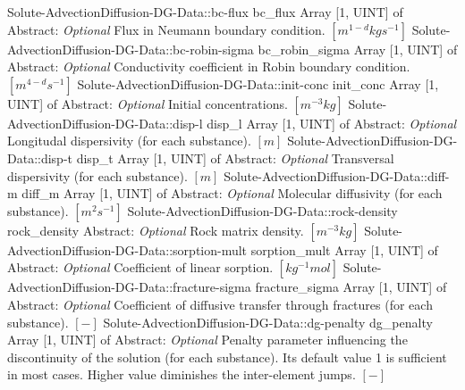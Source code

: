 \begin{RecordType}
		\RecKey
			{Solute-AdvectionDiffusion-DG-Data::bc-flux}
			{bc{\_}flux}
			{{Array [1, UINT] of }{Abstract}{: }}
			{ \it{Optional} }
			{{{Flux in Neumann boundary condition. }{$[m^{1-d}kgs^{-1}]$}}}
		\RecKey
			{Solute-AdvectionDiffusion-DG-Data::bc-robin-sigma}
			{bc{\_}robin{\_}sigma}
			{{Array [1, UINT] of }{Abstract}{: }}
			{ \it{Optional} }
			{{{Conductivity coefficient in Robin boundary condition. }{$[m^{4-d}s^{-1}]$}}}
		\RecKey
			{Solute-AdvectionDiffusion-DG-Data::init-conc}
			{init{\_}conc}
			{{Array [1, UINT] of }{Abstract}{: }}
			{ \it{Optional} }
			{{{Initial concentrations. }{$[m^{-3}kg]$}}}
		\RecKey
			{Solute-AdvectionDiffusion-DG-Data::disp-l}
			{disp{\_}l}
			{{Array [1, UINT] of }{Abstract}{: }}
			{ \it{Optional} }
			{{{Longitudal dispersivity (for each substance). }{$[m]$}}}
		\RecKey
			{Solute-AdvectionDiffusion-DG-Data::disp-t}
			{disp{\_}t}
			{{Array [1, UINT] of }{Abstract}{: }}
			{ \it{Optional} }
			{{{Transversal dispersivity (for each substance). }{$[m]$}}}
		\RecKey
			{Solute-AdvectionDiffusion-DG-Data::diff-m}
			{diff{\_}m}
			{{Array [1, UINT] of }{Abstract}{: }}
			{ \it{Optional} }
			{{{Molecular diffusivity (for each substance). }{$[m^{2}s^{-1}]$}}}
		\RecKey
			{Solute-AdvectionDiffusion-DG-Data::rock-density}
			{rock{\_}density}
			{{Abstract}{: }}
			{ \it{Optional} }
			{{{Rock matrix density. }{$[m^{-3}kg]$}}}
		\RecKey
			{Solute-AdvectionDiffusion-DG-Data::sorption-mult}
			{sorption{\_}mult}
			{{Array [1, UINT] of }{Abstract}{: }}
			{ \it{Optional} }
			{{{Coefficient of linear sorption. }{$[kg^{-1}mol]$}}}
		\RecKey
			{Solute-AdvectionDiffusion-DG-Data::fracture-sigma}
			{fracture{\_}sigma}
			{{Array [1, UINT] of }{Abstract}{: }}
			{ \it{Optional} }
			{{{Coefficient of diffusive transfer through fractures (for each substance). }{$[-]$}}}
		\RecKey
			{Solute-AdvectionDiffusion-DG-Data::dg-penalty}
			{dg{\_}penalty}
			{{Array [1, UINT] of }{Abstract}{: }}
			{ \it{Optional} }
			{{{Penalty parameter influencing the discontinuity of the solution (for each substance). Its default value 1 is sufficient in most cases. Higher value diminishes the inter-element jumps. }{$[-]$}}}
\end{RecordType}
